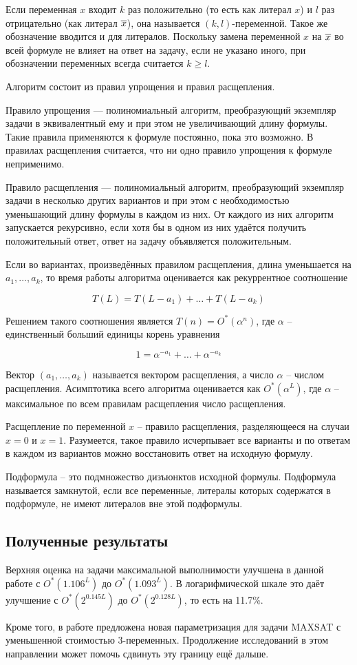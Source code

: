 Если переменная $x$ входит $k$ раз положительно (то есть как литерал $x$) и $l$ раз отрицательно (как литерал $\overline{x}$), она называется $(k,l)$-переменной. Такое же обозначение вводится и для литералов. Поскольку замена переменной $x$ на $\overline{x}$ во всей формуле не влияет на ответ на задачу, если не указано иного, при обозначении переменных всегда считается $k \geq l$.

Алгоритм состоит из правил упрощения и правил расщепления.

Правило упрощения — полиномиальный алгоритм, преобразующий экземпляр задачи в эквивалентный ему и при этом не увеличивающий длину формулы. Такие правила применяются к формуле постоянно, пока это возможно. В правилах расщепления считается, что ни одно правило упрощения к формуле неприменимо.

Правило расщепления — полиномиальный алгоритм, преобразующий экземпляр задачи в несколько других вариантов и при этом с необходимостью уменьшающий длину формулы в каждом из них. От каждого из них алгоритм запускается рекурсивно, если хотя бы в одном из них удаётся получить положительный ответ, ответ на задачу объявляется положительным.

Если во вариантах, произведённых правилом расщепления, длина уменьшается на $a_1, \dots, a_k$, то время работы алгоритма оценивается как рекуррентное соотношение

$$
 T(L) = T(L - a_1) + \dots + T(L - a_k)
$$

Решением такого соотношения является $T(n) = O^*(\alpha^n)$, где $\alpha$ -- единственный больший единицы корень уравнения

$$
 1 = \alpha^{-a_1} + \dots + \alpha^{-a_k}
$$

Вектор $(a_1, \dots, a_k)$ называется вектором расщепления, а число $\alpha$ -- числом расщепления. Асимптотика всего алгоритма оценивается как $O^*(\alpha^L)$, где $\alpha$ -- максимальное по всем правилам расщепления число расщепления.

Расщепление по переменной $x$ -- правило расщепления, разделяющееся на случаи $x = 0$ и $x = 1$. Разумеется, такое правило исчерпывает все варианты и по ответам в каждом из вариантов можно восстановить ответ на исходную формулу.

Подформула -- это подмножество дизъюнктов исходной формулы. Подформула называется замкнутой, если все переменные, литералы которых содержатся в подформуле, не имеют литералов вне этой подформулы.

\subsection*{Полученные результаты}

\firstpar{}Верхняя оценка на задачи максимальной выполнимости улучшена в данной работе с $O^*(1.106^L)$ до $O^*(1.093^L)$. В логарифмической шкале это даёт улучшение с $O^*(2^{0.145L})$ до $O^*(2^{0.128L})$, то есть на 11.7\%.

Кроме того, в работе предложена новая параметризация для задачи MAXSAT с уменьшенной стоимостью 3-переменных. Продолжение исследований в этом направлении может помочь сдвинуть эту границу ещё дальше.

